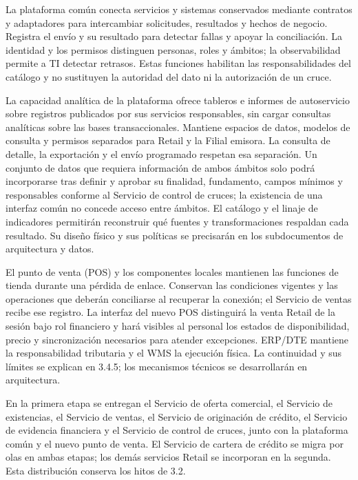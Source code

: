 \documentclass[11pt]{article}
\begin{document}
{La plataforma común conecta servicios y sistemas conservados mediante contratos y adaptadores para intercambiar solicitudes, resultados y hechos de negocio. Registra el envío y su resultado para detectar fallas y apoyar la conciliación. La identidad y los permisos distinguen personas, roles y ámbitos; la observabilidad permite a TI detectar retrasos. Estas funciones habilitan las responsabilidades del catálogo y no sustituyen la autoridad del dato ni la autorización de un cruce.}

{La capacidad analítica de la plataforma ofrece tableros e informes de autoservicio sobre registros publicados por sus servicios responsables, sin cargar consultas analíticas sobre las bases transaccionales. Mantiene espacios de datos, modelos de consulta y permisos separados para Retail y la Filial emisora. La consulta de detalle, la exportación y el envío programado respetan esa separación. Un conjunto de datos que requiera información de ambos ámbitos solo podrá incorporarse tras definir y aprobar su finalidad, fundamento, campos mínimos y responsables conforme al Servicio de control de cruces; la existencia de una interfaz común no concede acceso entre ámbitos. El catálogo y el linaje de indicadores permitirán reconstruir qué fuentes y transformaciones respaldan cada resultado. Su diseño físico y sus políticas se precisarán en los subdocumentos de arquitectura y datos.}

{El punto de venta (POS) y los componentes locales mantienen las funciones de tienda durante una pérdida de enlace. Conservan las condiciones vigentes y las operaciones que deberán conciliarse al recuperar la conexión; el Servicio de ventas recibe ese registro. La interfaz del nuevo POS distinguirá la venta Retail de la sesión bajo rol financiero y hará visibles al personal los estados de disponibilidad, precio y sincronización necesarios para atender excepciones. ERP/DTE mantiene la responsabilidad tributaria y el WMS la ejecución física. La continuidad y sus límites se explican en 3.4.5; los mecanismos técnicos se desarrollarán en arquitectura.}

{En la primera etapa se entregan el Servicio de oferta comercial, el Servicio de existencias, el Servicio de ventas, el Servicio de originación de crédito, el Servicio de evidencia financiera y el Servicio de control de cruces, junto con la plataforma común y el nuevo punto de venta. El Servicio de cartera de crédito se migra por olas en ambas etapas; los demás servicios Retail se incorporan en la segunda. Esta distribución conserva los hitos de 3.2.}
\end{document}
